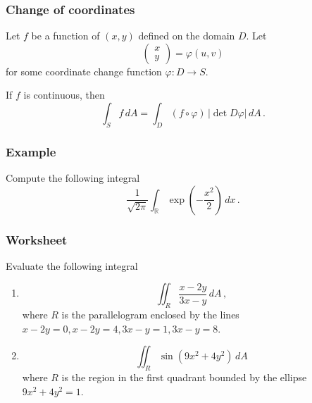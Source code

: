 \documentclass[aspectratio=169]{beamer}
\newcommand{\R}{\mathbb{R}}
\begin{document}
\begin{frame}
    \frametitle{Change of coordinates}
    Let $f$ be a function of  $(x,y)$ defined on the domain $D$. 
    Let 
    \begin{equation*}
        \begin{pmatrix}
            x \\ y
        \end{pmatrix}
         = \varphi(u,v)
    \end{equation*}
    for some coordinate change function $\varphi: D \to S$.
    \begin{theorem}
        If $f$ is continuous, then
        \begin{equation*}
            \int_S f \, dA = \int_D (f\circ \varphi) \,|\det D \varphi| \, dA \,.
        \end{equation*}
    \end{theorem}
\end{frame}


\begin{frame}
    \frametitle{Example}
    Compute the following integral
    \begin{equation*}
        \frac{1}{\sqrt{2\pi}}\int_{\R} \exp\left(-\frac{x^2}{2}\right) \, dx \,.
    \end{equation*}
\end{frame}


\begin{frame}
    \frametitle{Worksheet}
    Evaluate the following integral
    \begin{enumerate}
        \item 
            \begin{equation*}
                \iint_R \frac{x - 2y}{3x - y} \, dA \,,
            \end{equation*}
            where $R$ is the parallelogram enclosed by the lines
            $x-2y = 0, x- 2y = 4, 3x-y = 1, 3x - y = 8$.

        \item 
            \begin{equation*}
                \iint_R \sin(9x^2 + 4y^2) \, dA
            \end{equation*}
            where $R$ is the region in the first quadrant bounded
            by the ellipse $9x^2 + 4y^2 = 1$.
    \end{enumerate}
\end{frame}
\end{document}
